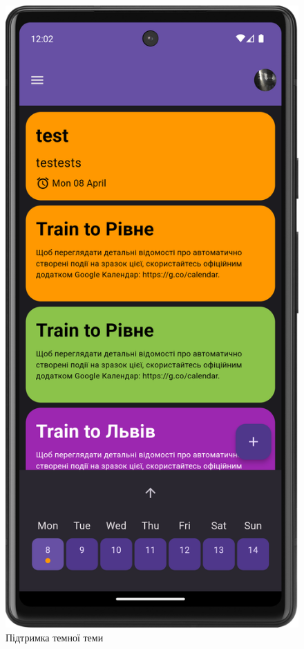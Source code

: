 \documentclass[oneside,14pt]{extarticle}
\begin{document}
\begin{normalsize}
\begin{figure}[H]
\begin{minipage}{0.48\textwidth}
		\end{minipage}\hfill
		\begin{minipage}{0.48\textwidth}
			\centering
			\includegraphics[scale=0.12]{9}
			\caption{Підтримка темної теми}
		\end{minipage}
	\end{figure}
	

\end{normalsize}
\end{document}
